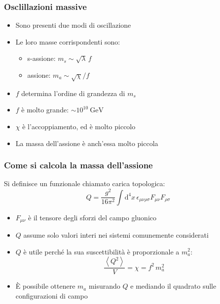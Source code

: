 \begin{frame}
    \frametitle{Osclillazioni massive}
    \begin{itemize}
        \item Sono presenti due modi di oscillazione
        \item Le loro masse corrispondenti sono:
            \begin{itemize}
                \item s-assione: $m_s \sim \sqrt\lambda\,f$
                \item assione: $m_a \sim \sqrt\chi/f$
            \end{itemize}
        \item $f$ determina l'ordine di grandezza di $m_s$
        \item $f$ è molto grande: $\sim 10^{10}\ \text{GeV}$
        \item $\chi$ è l'accoppiamento, ed è molto piccolo
        \item La massa dell'assione è anch'essa molto piccola
    \end{itemize}
\end{frame}

\begin{frame}
    \frametitle{Come si calcola la massa dell'assione}
    Si definisce un funzionale chiamato {\color{fzjblue} carica topologica}:
    $$Q = \frac{g^2}{16\pi^2}\int\mathrm{d}^4x\,%
    \epsilon_{\mu\nu\rho\sigma}F_{\mu\nu}F_{\rho\sigma}$$
    \begin{itemize}
        \item $F_{\mu\nu}$ è il tensore degli sforzi del campo gluonico
        \item $Q$ assume solo valori interi nei sistemi comunemente considerati
        \item $Q$ è utile perché la sua suscettibilità è proporzionale a $m_a^2$:
            $$\frac{\left<Q^2\right>}{V}=\chi=f^2\,m_a^2$$
        \item È possibile ottenere $m_a$ misurando $Q$ %
            e mediando il quadrato sulle configurazioni di campo
    \end{itemize}
\end{frame}

